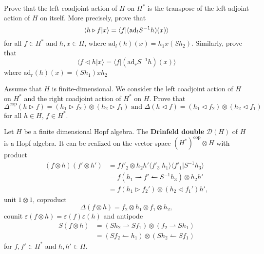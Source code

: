 \begin{exercise}
Prove that the left coadjoint action of $H$ on $H^*$ is the
transpose of the left adjoint action of $H$ on itself. More
precisely, prove that
\[
\langle h\triangleright f|x\rangle=\langle f|(\mathrm{ad}_l S^{-1}h)(x)\rangle\\
\]
for all $f\in H^*$ and $h,x \in H$,
where $\mathrm{ad}_l(h)(x)=h_1x(Sh_2)$. 
Similarly, prove that 
\[
\langle f\triangleleft h|x\rangle=\langle f|(\mathrm{ad}_r S^{-1}h)(x)\rangle
\]
where $\mathrm{ad}_r(h)(x)=(Sh_1)xh_2$
\end{exercise}

\begin{exercise}
Assume that $H$ is finite-dimensional. We consider the left coadjoint action of
$H$ on $H^*$ and the right coadjoint action of $H^*$ on $H$. Prove that 
\begin{equation*}
	\Delta^{\mathrm{cop}}(h\triangleright f)=(h_1\triangleright f_2)\otimes(h_2\triangleright f_1)\text{ and }
	\Delta(h\triangleleft f)=(h_1\triangleleft f_2)\otimes(h_2\triangleleft f_1)
\end{equation*}
for all $h\in H$, $f\in H^*$.
\end{exercise}

\begin{theorem}
\label{theorem:double}
Let $H$ be a finite dimensional Hopf algebra. The \textbf{Drinfeld double}
$\mathcal{D}(H)$ of $H$ is a Hopf algebra. It can be realized on the vector
space $(H^{*})^{\text{cop}}\otimes H$ with product
\begin{align*}
(f\otimes h)(f'\otimes h')&=ff'_{2}\otimes h_{2}h'\langle f'_{3}|h_{1}\rangle\langle f'_{1}|S^{-1}h_{3}\rangle\\
&=f(h_1\rightharpoonup f'\leftharpoonup S^{-1}h_3)\otimes h_2h'\\
&=f(h_1\triangleright f_2')\otimes (h_2\triangleleft f_1')h',
\end{align*}
unit $1\otimes1$, coproduct 
\[
\Delta(f\otimes h)=f_{2}\otimes h_{1}\otimes f_{1}\otimes h_{2},
\]
counit $\varepsilon(f\otimes h)=\varepsilon(f)\varepsilon(h)$ and
antipode 
\begin{align*}
S(f\otimes h)&=(Sh_2\rightharpoonup Sf_1)\otimes (f_2\rightharpoonup Sh_1)\\
&=(Sf_2\leftharpoonup h_1)\otimes(Sh_2\leftharpoonup Sf_1)
\end{align*}
for $f,f'\in H^*$ and $h,h'\in H$. 
\end{theorem}

